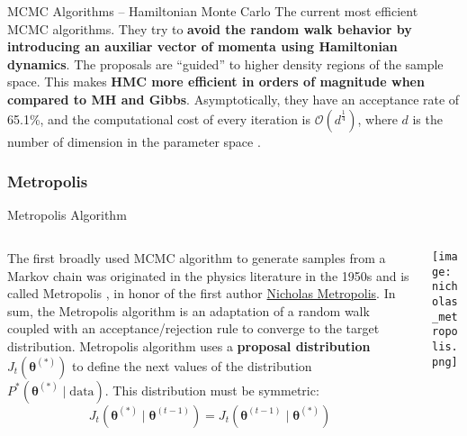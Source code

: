 \begin{frame}{MCMC Algorithms -- Hamiltonian Monte Carlo}
	The current most efficient MCMC algorithms.
	They try to \textbf{avoid the random walk behavior by introducing an auxiliar vector of momenta
		using Hamiltonian dynamics}.
	The proposals are ``guided'' to higher density regions of the sample space.
	This makes \textbf{HMC more efficient in orders of magnitude when compared to MH and Gibbs}.
	\vfill
	Asymptotically, they have an acceptance rate of 65.1\%,
	and the computational cost of every iteration is $\mathcal{O}(d^{\frac{1}{4}})$,
	where $d$ is the number of dimension in the parameter space \parencite{beskosOptimalTuningHybrid2013}.
\end{frame}

\subsubsection{Metropolis}
\begin{frame}{Metropolis Algorithm}
	\begin{columns}
		\begin{column}{0.8\textwidth}
			The first broadly used MCMC algorithm to generate samples from a Markov chain
			was originated in the physics literature in the 1950s and is called Metropolis
			\parencite{metropolisEquationStateCalculations1953},
			in honor of the first author
			\href{https://en.wikipedia.org/wiki/Nicholas_Metropolis}{Nicholas Metropolis}.
			\vfill
			In sum, the Metropolis algorithm is an adaptation of a random walk coupled
			with an acceptance/rejection rule to converge to the target distribution.
			\vfill
			Metropolis algorithm uses a \textbf{proposal distribution}
			$J_t(\boldsymbol{\theta}^{(*)})$
			to define the next values of the distribution
			$P^*(\boldsymbol{\theta}^{(*)} \mid \text{data})$.
			This distribution must be symmetric:
			$$
				J_t (\boldsymbol{\theta}^{(*)} \mid \boldsymbol{\theta}^{(t-1)}) = J_t(\boldsymbol{\theta}^{(t-1)} \mid \boldsymbol{\theta}^{(*)})
			$$
		\end{column}
		\begin{column}{0.2\textwidth}
			\centering
			\texttt{[image: nicholas\_metropolis.png]}
		\end{column}
	\end{columns}
\end{frame}

